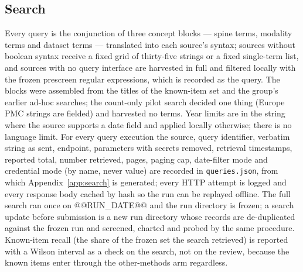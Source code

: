 \documentclass[11pt,a4paper]{article}
\makeatletter
\newcommand{\runDate}{@@RUN_DATE@@}
\makeatother
\begin{document}
\subsection{Search}\label{sec:search}
Every query is the conjunction of three concept blocks --- spine terms, modality terms and dataset terms --- translated into each source's syntax; sources without boolean syntax receive a fixed grid of thirty-five strings or a fixed single-term list, and sources with no query interface are harvested in full and filtered locally with the frozen prescreen regular expressions, which is recorded as the query. The blocks were assembled from the titles of the known-item set and the group's earlier ad-hoc searches; the count-only pilot search decided one thing (Europe PMC strings are fielded) and harvested no terms. Year limits are in the string where the source supports a date field and applied locally otherwise; there is no language limit. For every query execution the source, query identifier, verbatim string as sent, endpoint, parameters with secrets removed, retrieval timestamps, reported total, number retrieved, pages, paging cap, date-filter mode and credential mode (by name, never value) are recorded in \texttt{queries.json}, from which Appendix~\ref{app:search} is generated; every HTTP attempt is logged and every response body cached by hash so the run can be replayed offline. The full search ran once on \runDate{} and the run directory is frozen; a search update before submission is a new run directory whose records are de-duplicated against the frozen run and screened, charted and probed by the same procedure. Known-item recall (the share of the frozen set the search retrieved) is reported with a Wilson interval as a check on the search, not on the review, because the known items enter through the other-methods arm regardless.
\end{document}
